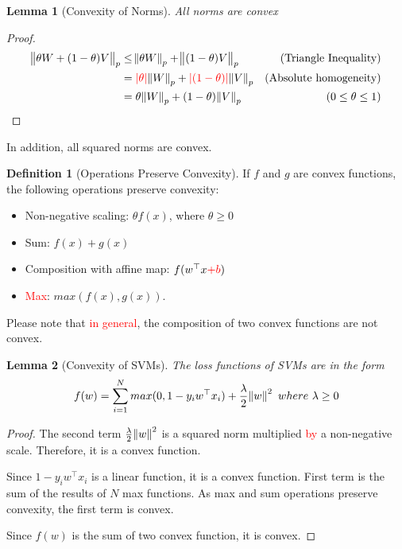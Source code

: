 \documentclass{article}
\newtheorem{lemma}{Lemma}
\theoremstyle{definition}
\newtheorem{definition}{Definition}[section]
\theoremstyle{remark}
\newcommand{\red}[1]{\textcolor{red}{#1}}
\begin{document}
\begin{lemma}[Convexity of Norms]
All norms are convex
\end{lemma}
\begin{proof}
\begin{align*}
\norm{\theta W + (1-\theta) V}_{p} &\leq \norm{ \theta W}_{p} + \norm{(1-\theta) V}_{p}      &\text{(Triangle Inequality)}    \\
&= \red{|\theta|} \norm{W}_{p} + \red{|(1-\theta)|} \norm{V}_{p} &\text{(Absolute homogeneity)}      \\
&= \theta \norm{W}_{p} + (1 - \theta) \norm{V}_{p} &(0 \leq \theta \leq 1)    
\end{align*} 
\end{proof}

In addition, all squared norms are convex.

\begin{definition}[Operations Preserve Convexity]
If $f$ and $g$ are convex functions, the following operations preserve convexity:

\begin{itemize}
    \item Non-negative scaling: $\theta f(x)$, where $\theta \geq 0$
    \item Sum: $f(x) + g(x)$
    \item Composition with affine map: $f(w^{\top} x \red{ + b})$
    \item \red{Max}: $max(f(x), g(x))$.
\end{itemize}
\end{definition}
Please note that \red{in general}, the composition of two convex functions are not convex.

\begin{lemma}[Convexity of SVMs]

The loss functions of SVMs are in the form 
\begin{equation}
    f(w) = \sum_{i=1}^{N}max(0, 1 - y_{i}w^{\top}x_{i}) + \frac{\lambda}{2}\norm{w}^{2}\ where\ \lambda \geq 0
\end{equation}
\end{lemma}
\begin{proof}
The second term $\frac{\lambda}{2}\norm{w}^{2}$ is a squared norm multiplied \red{by} a non-negative scale. Therefore, it is a convex function.

Since $1 - y_{i}w^{\top}x_{i}$ is a linear function, it is a convex function. First term is the sum of the results of $N$ max functions. As max and sum operations preserve convexity, the first term is convex.

Since $f(w)$ is the sum of two convex function, it is convex.
\end{proof}
\end{document}
